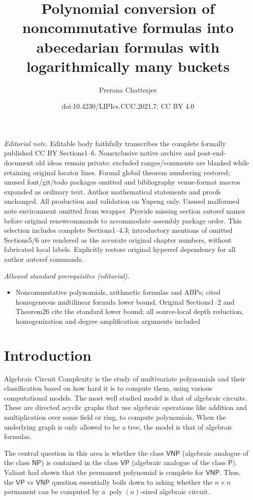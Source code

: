 \documentclass[10pt,a4paper]{article}
\title{Polynomial conversion of noncommutative formulas into abecedarian formulas with logarithmically many buckets}
\author{Prerona Chatterjee}
\date{doi:10.4230/LIPIcs.CCC.2021.7; CC BY 4.0}
\def\poly{\operatorname{poly}}
\def\VP{\mathsf{VP}}
\def\VNP{\mathsf{VNP}}
\def\P{\mathsf{P}}
\def\NP{\mathsf{NP}}
\begin{document}
\maketitle
\noindent\textit{Editorial note.} Editable body faithfully transcribes the complete formally published CC BY Sections1–6. Nonexclusive native archive and post-end-document old ideas remain private; excluded ranges/comments are blanked while retaining original locator lines. Formal global theorem numbering restored; unused font/git/todo packages omitted and bibliography venue-format macros expanded as ordinary text. Author mathematical statements and proofs unchanged. All production and validation on Yupeng only. Unused malformed note environment omitted from wrapper. Provide missing section autoref names before original renewcommands to accommodate assembly package order. This selection includes complete Sections1–4.3; introductory mentions of omitted Sections5/6 are rendered as the accurate original chapter numbers, without fabricated local labels. Explicitly restore original hyperref dependency for all author autoref commands.\par\medskip
\noindent\textit{Allowed standard prerequisites (editorial).}\begin{itemize}
\item Noncommutative polynomials, arithmetic formulas and ABPs; cited homogeneous multilinear formula lower bound. Original Sections1–2 and Theorem26 cite the standard lower bound; all source-local depth reduction, homogenization and degree amplification arguments included
\end{itemize}\medskip
\section{Introduction}
Algebraic Circuit Complexity is the study of multivariate polynomials and their classification based on how hard it is to compute them, using various computational models. 
The most well studied model is that of algebraic circuits. 
These are directed acyclic graphs that use algebraic operations like addition and multiplication over some field or ring, to compute polynomials. 
When the underlying graph is only allowed to be a tree, the model is that of algebraic formulas.

The central question in this area is whether the class $\VNP$ (algebraic analogue of the class $\NP$) is contained in the class $\VP$ (algebraic analogue of the class $\P$).
Valiant \cite{V79} had shown that the permanent polynomial is complete for $\VNP$.
Thus, the $\VP$ vs $\VNP$ question essentially boils down to asking whether the $n \times n$ permanent can be computed by a $\poly(n)$-sized algebraic circuit.
\end{document}
